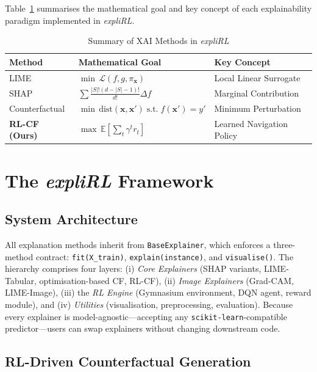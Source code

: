 \documentclass[conference]{IEEEtran}
\newcommand{\E}{\mathbb{E}}
\newcommand{\bx}{\mathbf{x}}
\newcommand{\bxp}{\mathbf{x}'}
\begin{document}
Table~\ref{tab:method_summary} summarises the mathematical goal and key concept
of each explainability paradigm implemented in \emph{expliRL}.

\begin{table}[t]
\centering
\caption{Summary of XAI Methods in \emph{expliRL}}
\label{tab:method_summary}
\begin{tabular}{lp{3.0cm}p{2.2cm}}
\toprule
\textbf{Method} & \textbf{Mathematical Goal} & \textbf{Key Concept} \\
\midrule
LIME  & $\min\,\mathcal{L}(f,g,\pi_\bx)$ & Local Linear Surrogate \\[3pt]
SHAP  & $\sum \frac{|S|!(d{-}|S|{-}1)!}{d!}\Delta f$ & Marginal Contribution \\[3pt]
Counterfactual & $\min\,\text{dist}(\bx,\bxp)\;\text{s.t.}\;f(\bxp){=}y'$ & Minimum Perturbation \\[3pt]
\textbf{RL-CF (Ours)} & $\max\,\E\!\left[\sum_t\gamma^t r_t\right]$ & Learned Navigation Policy \\
\bottomrule
\end{tabular}
\end{table}

\section{The \emph{expliRL} Framework}
\label{sec:method}

\subsection{System Architecture}

All explanation methods inherit from \texttt{BaseExplainer}, which enforces a
three-method contract: \texttt{fit(X\_train)}, \texttt{explain(instance)}, and
\texttt{visualise()}. The hierarchy comprises four layers: (i) \emph{Core
Explainers} (SHAP variants, LIME-Tabular, optimisation-based CF, RL-CF), (ii)
\emph{Image Explainers} (Grad-CAM, LIME-Image), (iii) the \emph{RL Engine}
(Gymnasium environment, DQN agent, reward module), and (iv) \emph{Utilities}
(visualisation, preprocessing, evaluation). Because every explainer is
model-agnostic---accepting any \texttt{scikit-learn}-compatible predictor---users
can swap explainers without changing downstream code.

\subsection{RL-Driven Counterfactual Generation}
\label{subsec:rl_cf}
\end{document}
